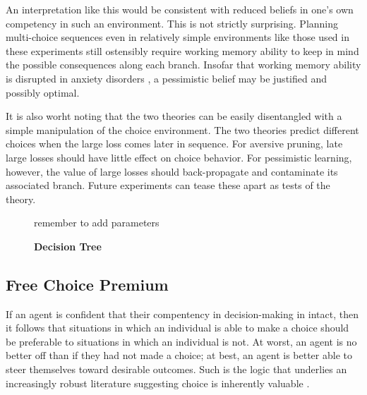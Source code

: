 \documentclass[11pt]{article} %
\begin{document}
An interpretation like this would be consistent with reduced beliefs in one's
own competency in such an environment. This is not strictly surprising. Planning
multi-choice sequences even in relatively simple environments like those used
in these experiments still ostensibly require working memory ability to keep in
mind the possible consequences along each branch. Insofar that working memory
ability is disrupted in anxiety disorders \citep{Moran2016}, a pessimistic belief
may be justified and possibly optimal.

It is also worht noting that the two theories can be easily disentangled with a
simple manipulation of the choice environment. The two theories predict
different choices when the large loss comes later in sequence. For aversive pruning,
late large losses should have little effect on choice behavior. For pessimistic
learning, however, the value of large losses should back-propagate and contaminate
its associated branch. Future experiments can tease these apart as tests of the theory.

\begin{figure}
  \centerline{%
  }
  \caption{\textbf{Decision Tree}}
  \par remember to add parameters
\end{figure}

\subsection{Free Choice Premium}

If an agent is confident that their compentency in decision-making in intact,
then it follows that situations in which an individual is able to make a choice
should be preferable to situations in which an individual is not. At worst,
an agent is no better off than if they had not made a choice; at best, an agent
is better able to steer themselves toward desirable outcomes. Such is the logic
that underlies an increasingly robust literature suggesting choice is inherently
valuable \citep{Leotti2010}.
\end{document}
